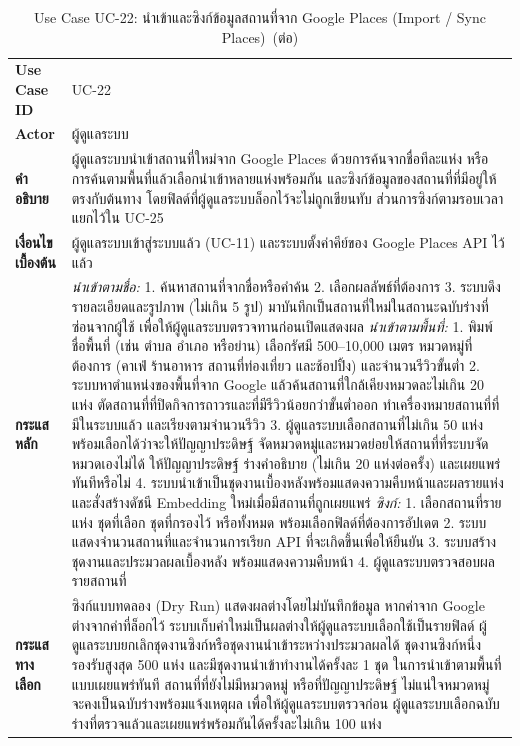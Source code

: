 \begin{longtable}{|p{3.2cm}|p{10cm}|}
\caption{Use Case UC-22: นำเข้าและซิงก์ข้อมูลสถานที่จาก Google Places (Import / Sync Places)}\label{tab:uc22}\\
\hline
\endfirsthead
\caption[]{Use Case UC-22: นำเข้าและซิงก์ข้อมูลสถานที่จาก Google Places (Import / Sync Places)~(\textnormal{ต่อ})}\\
\hline
\endhead
\textbf{Use Case ID} & UC-22 \\ \hline
\textbf{Actor} & ผู้ดูแลระบบ \\ \hline
\textbf{คำอธิบาย} & ผู้ดูแลระบบนำเข้าสถานที่ใหม่จาก Google Places ด้วยการค้นจากชื่อทีละแห่ง หรือการค้นตามพื้นที่แล้วเลือกนำเข้าหลายแห่งพร้อมกัน และซิงก์ข้อมูลของสถานที่ที่มีอยู่ให้ตรงกับต้นทาง โดยฟิลด์ที่ผู้ดูแลระบบล็อกไว้จะไม่ถูกเขียนทับ ส่วนการซิงก์ตามรอบเวลาแยกไว้ใน UC-25 \\ \hline
\textbf{เงื่อนไขเบื้องต้น} & ผู้ดูแลระบบเข้าสู่ระบบแล้ว (UC-11) และระบบตั้งค่าคีย์ของ Google Places API ไว้แล้ว \\ \hline
\textbf{กระแสหลัก} & \textit{นำเข้าตามชื่อ:} 1. ค้นหาสถานที่จากชื่อหรือคำค้น 2. เลือกผลลัพธ์ที่ต้องการ 3. ระบบดึงรายละเอียดและรูปภาพ (ไม่เกิน 5 รูป) มาบันทึกเป็นสถานที่ใหม่ในสถานะฉบับร่างที่ซ่อนจากผู้ใช้ เพื่อให้ผู้ดูแลระบบตรวจทานก่อนเปิดแสดงผล \newline \textit{นำเข้าตามพื้นที่:} 1. พิมพ์ชื่อพื้นที่ (เช่น ตำบล อำเภอ หรือย่าน) เลือกรัศมี 500--10,000 เมตร หมวดหมู่ที่ต้องการ (คาเฟ่ ร้านอาหาร สถานที่ท่องเที่ยว และช้อปปิ้ง) และจำนวนรีวิวขั้นต่ำ 2. ระบบหาตำแหน่งของพื้นที่จาก Google แล้วค้นสถานที่ใกล้เคียงหมวดละไม่เกิน 20 แห่ง ตัดสถานที่ที่ปิดกิจการถาวรและที่มีรีวิวน้อยกว่าขั้นต่ำออก ทำเครื่องหมายสถานที่ที่มีในระบบแล้ว และเรียงตามจำนวนรีวิว 3. ผู้ดูแลระบบเลือกสถานที่ไม่เกิน 50 แห่ง พร้อมเลือกได้ว่าจะให้ปัญญาประดิษฐ์ จัดหมวดหมู่และหมวดย่อยให้สถานที่ที่ระบบจัดหมวดเองไม่ได้ ให้ปัญญาประดิษฐ์ ร่างคำอธิบาย (ไม่เกิน 20 แห่งต่อครั้ง) และเผยแพร่ทันทีหรือไม่ 4. ระบบนำเข้าเป็นชุดงานเบื้องหลังพร้อมแสดงความคืบหน้าและผลรายแห่ง และสั่งสร้างดัชนี Embedding ใหม่เมื่อมีสถานที่ถูกเผยแพร่ \newline \textit{ซิงก์:} 1. เลือกสถานที่รายแห่ง ชุดที่เลือก ชุดที่กรองไว้ หรือทั้งหมด พร้อมเลือกฟิลด์ที่ต้องการอัปเดต 2. ระบบแสดงจำนวนสถานที่และจำนวนการเรียก API ที่จะเกิดขึ้นเพื่อให้ยืนยัน 3. ระบบสร้างชุดงานและประมวลผลเบื้องหลัง พร้อมแสดงความคืบหน้า 4. ผู้ดูแลระบบตรวจสอบผลรายสถานที่ \\ \hline
\textbf{กระแสทางเลือก} & ซิงก์แบบทดลอง (Dry Run) แสดงผลต่างโดยไม่บันทึกข้อมูล \newline หากค่าจาก Google ต่างจากค่าที่ล็อกไว้ ระบบเก็บค่าใหม่เป็นผลต่างให้ผู้ดูแลระบบเลือกใช้เป็นรายฟิลด์ \newline ผู้ดูแลระบบยกเลิกชุดงานซิงก์หรือชุดงานนำเข้าระหว่างประมวลผลได้ \newline ชุดงานซิงก์หนึ่งรองรับสูงสุด 500 แห่ง และมีชุดงานนำเข้าทำงานได้ครั้งละ 1 ชุด \newline ในการนำเข้าตามพื้นที่แบบเผยแพร่ทันที สถานที่ที่ยังไม่มีหมวดหมู่ หรือที่ปัญญาประดิษฐ์ ไม่แน่ใจหมวดหมู่ จะคงเป็นฉบับร่างพร้อมแจ้งเหตุผล เพื่อให้ผู้ดูแลระบบตรวจก่อน \newline ผู้ดูแลระบบเลือกฉบับร่างที่ตรวจแล้วและเผยแพร่พร้อมกันได้ครั้งละไม่เกิน 100 แห่ง \\ \hline

\end{longtable}
